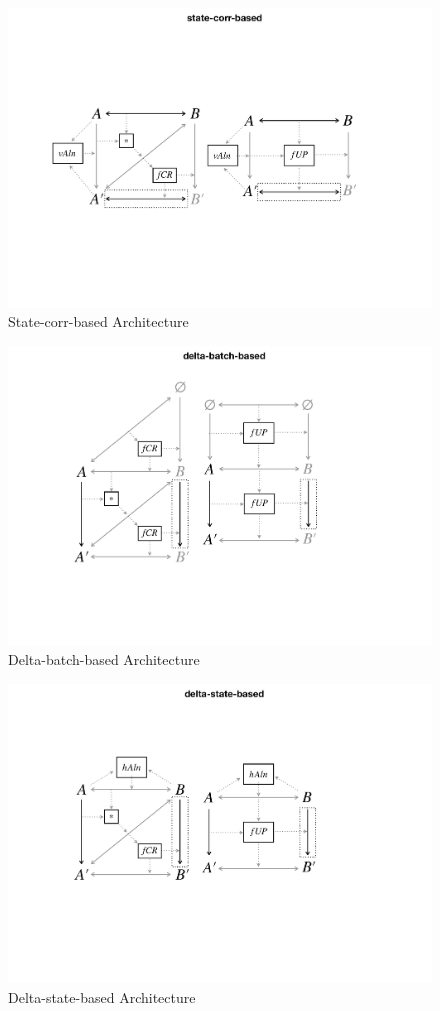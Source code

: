 \begin{figure}[tb!]
	\centering
	\includegraphics[width=\columnwidth]{diagrams/state-corr-based}
	\caption{State-corr-based Architecture}
	\label{fig:stateCorrBased}
\end{figure}

\begin{figure}[tb!]
	\centering
	\includegraphics[width=0.73\columnwidth]{diagrams/delta-batch-based}
	\caption{Delta-batch-based Architecture}
	\label{fig:deltaBatchBased}
\end{figure}

\begin{figure}[tb!]
	\centering
	\includegraphics[width=0.75\columnwidth]{diagrams/delta-state-based}
	\caption{Delta-state-based Architecture}
	\label{fig:stateBatchBased}
\end{figure}

